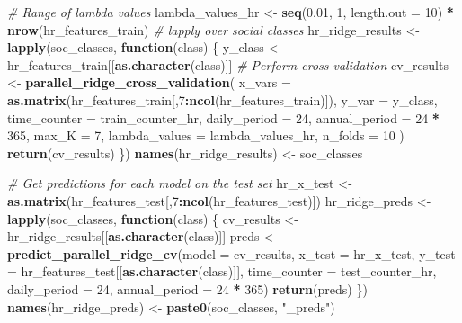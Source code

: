 \documentclass[
]{article}
\newenvironment{Shaded}{\begin{snugshade}}{\end{snugshade}}
\newcommand{\AttributeTok}[1]{\textcolor[rgb]{0.13,0.29,0.53}{#1}}
\newcommand{\CommentTok}[1]{\textcolor[rgb]{0.56,0.35,0.01}{\textit{#1}}}
\newcommand{\ControlFlowTok}[1]{\textcolor[rgb]{0.13,0.29,0.53}{\textbf{#1}}}
\newcommand{\DecValTok}[1]{\textcolor[rgb]{0.00,0.00,0.81}{#1}}
\newcommand{\FloatTok}[1]{\textcolor[rgb]{0.00,0.00,0.81}{#1}}
\newcommand{\FunctionTok}[1]{\textcolor[rgb]{0.13,0.29,0.53}{\textbf{#1}}}
\newcommand{\NormalTok}[1]{#1}
\newcommand{\OtherTok}[1]{\textcolor[rgb]{0.56,0.35,0.01}{#1}}
\newcommand{\SpecialCharTok}[1]{\textcolor[rgb]{0.81,0.36,0.00}{\textbf{#1}}}
\newcommand{\StringTok}[1]{\textcolor[rgb]{0.31,0.60,0.02}{#1}}
\begin{document}
\begin{Shaded}
\begin{Highlighting}[]
\CommentTok{\# Range of lambda values}
\NormalTok{lambda\_values\_hr }\OtherTok{\textless{}{-}} \FunctionTok{seq}\NormalTok{(}\FloatTok{0.01}\NormalTok{, }\DecValTok{1}\NormalTok{, }\AttributeTok{length.out =} \DecValTok{10}\NormalTok{) }\SpecialCharTok{*} \FunctionTok{nrow}\NormalTok{(hr\_features\_train)}
\CommentTok{\# lapply over social classes}
\NormalTok{hr\_ridge\_results }\OtherTok{\textless{}{-}} \FunctionTok{lapply}\NormalTok{(soc\_classes, }\ControlFlowTok{function}\NormalTok{(class) \{}
\NormalTok{  y\_class }\OtherTok{\textless{}{-}}\NormalTok{ hr\_features\_train[[}\FunctionTok{as.character}\NormalTok{(class)]]}
  \CommentTok{\# Perform cross{-}validation}
\NormalTok{  cv\_results }\OtherTok{\textless{}{-}} \FunctionTok{parallel\_ridge\_cross\_validation}\NormalTok{(}
    \AttributeTok{x\_vars =} \FunctionTok{as.matrix}\NormalTok{(hr\_features\_train[,}\DecValTok{7}\SpecialCharTok{:}\FunctionTok{ncol}\NormalTok{(hr\_features\_train)]),}
    \AttributeTok{y\_var =}\NormalTok{ y\_class,}
    \AttributeTok{time\_counter =}\NormalTok{ train\_counter\_hr,}
    \AttributeTok{daily\_period =} \DecValTok{24}\NormalTok{,}
    \AttributeTok{annual\_period =} \DecValTok{24} \SpecialCharTok{*} \DecValTok{365}\NormalTok{,}
    \AttributeTok{max\_K =} \DecValTok{7}\NormalTok{,}
    \AttributeTok{lambda\_values =}\NormalTok{ lambda\_values\_hr,}
    \AttributeTok{n\_folds =} \DecValTok{10}
\NormalTok{  )}
  \FunctionTok{return}\NormalTok{(cv\_results)}
\NormalTok{\})}
\FunctionTok{names}\NormalTok{(hr\_ridge\_results) }\OtherTok{\textless{}{-}}\NormalTok{ soc\_classes}

\CommentTok{\# Get predictions for each model on the test set}
\NormalTok{hr\_x\_test }\OtherTok{\textless{}{-}} \FunctionTok{as.matrix}\NormalTok{(hr\_features\_test[,}\DecValTok{7}\SpecialCharTok{:}\FunctionTok{ncol}\NormalTok{(hr\_features\_test)])}
\NormalTok{hr\_ridge\_preds }\OtherTok{\textless{}{-}} \FunctionTok{lapply}\NormalTok{(soc\_classes, }\ControlFlowTok{function}\NormalTok{(class) \{}
\NormalTok{  cv\_results }\OtherTok{\textless{}{-}}\NormalTok{ hr\_ridge\_results[[}\FunctionTok{as.character}\NormalTok{(class)]]}
\NormalTok{  preds }\OtherTok{\textless{}{-}} \FunctionTok{predict\_parallel\_ridge\_cv}\NormalTok{(}\AttributeTok{model =}\NormalTok{ cv\_results,}
                                     \AttributeTok{x\_test =}\NormalTok{ hr\_x\_test,}
                                     \AttributeTok{y\_test =}\NormalTok{ hr\_features\_test[[}\FunctionTok{as.character}\NormalTok{(class)]],}
                                     \AttributeTok{time\_counter =}\NormalTok{ test\_counter\_hr,}
                                     \AttributeTok{daily\_period =} \DecValTok{24}\NormalTok{,}
                                     \AttributeTok{annual\_period =} \DecValTok{24} \SpecialCharTok{*} \DecValTok{365}\NormalTok{)}
  \FunctionTok{return}\NormalTok{(preds)}
\NormalTok{\})}
\FunctionTok{names}\NormalTok{(hr\_ridge\_preds) }\OtherTok{\textless{}{-}} \FunctionTok{paste0}\NormalTok{(soc\_classes, }\StringTok{"\_preds"}\NormalTok{)}
\end{Highlighting}
\end{Shaded}
\end{document}

